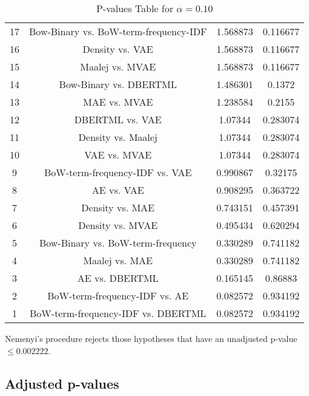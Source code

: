 \documentclass[a4paper,10pt]{article}
\begin{document}
\begin{landscape}
\begin{table}[!htp]
\begin{tabular}{cccc}
17&Bow-Binary vs. BoW-term-frequency-IDF&1.568873&0.116677\\
16&Density vs. VAE&1.568873&0.116677\\
15&Maalej vs. MVAE&1.568873&0.116677\\
14&Bow-Binary vs. DBERTML&1.486301&0.1372\\
13&MAE vs. MVAE&1.238584&0.2155\\
12&DBERTML vs. VAE&1.07344&0.283074\\
11&Density vs. Maalej&1.07344&0.283074\\
10&VAE vs. MVAE&1.07344&0.283074\\
9&BoW-term-frequency-IDF vs. VAE&0.990867&0.32175\\
8&AE vs. VAE&0.908295&0.363722\\
7&Density vs. MAE&0.743151&0.457391\\
6&Density vs. MVAE&0.495434&0.620294\\
5&Bow-Binary vs. BoW-term-frequency&0.330289&0.741182\\
4&Maalej vs. MAE&0.330289&0.741182\\
3&AE vs. DBERTML&0.165145&0.86883\\
2&BoW-term-frequency-IDF vs. AE&0.082572&0.934192\\
1&BoW-term-frequency-IDF vs. DBERTML&0.082572&0.934192\\
\hline
\end{tabular}
\caption{P-values Table for $\alpha=0.10$}
\end{table}Nemenyi's procedure rejects those hypotheses that have an unadjusted p-value $\le0.002222$.

\pagebreak

\subsection{Adjusted p-values}


\end{landscape}
\end{document}
